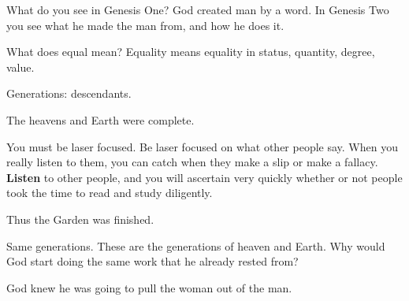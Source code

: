 \documentclass[12pt]{article}
\begin{document}
	What do you see in Genesis One? God created man by a word. 
	In Genesis Two you see what he made the man from, and how
	he does it.

	What does equal mean? Equality means equality in status, 
	quantity, degree, value.

	\begin{quote}
		\BibleGenesisFiveOne{}
	\end{quote}

	Generations: descendants.

	\begin{quote}
		\BibleGenesisTwoOne{}
	\end{quote}

	The heavens and Earth were complete.

	\begin{quote}
		\BibleGenesisOneFour{}
		\BibleGenesisOneFive{}
		\BibleGenesisOneSix{}
	\end{quote}

	You must be laser focused. Be laser focused on what other people
	say. When you really listen to them, you can catch when they make
	a slip or make a fallacy. \textbf{Listen} to other people, and you
	will ascertain very quickly whether or not people took the time
	to read and study diligently.

	\begin{quote}
		\BibleGenesisOneSeven{}
		\BibleGenesisOneEight{}
		\BibleGenesisOneNine{}
		\BibleGenesisOneTen{}
	\end{quote}

	Thus the Garden was finished.

	\begin{quote}
		\BibleGenesisTwoTwo{}
		\BibleGenesisTwoThree{}
		\BibleGenesisTwoFour{}
	\end{quote}

	Same generations. These are the generations of heaven and Earth.
	Why would God start doing the same work that he already rested
	from?

	\begin{quote}
		\BibleGenesisOneTwentySeven{}
	\end{quote}

	God knew he was going to pull the woman out of the man.

	\begin{quote}
		\BibleRevelationTwoSeven{}
	\end{quote}

	\begin{quote}
		\BibleRomansSevenTwenty{}
		\BibleRomansSevenTwentyOne{}
		\BibleRomansSevenTwentyTwo{}
		\BibleRomansSevenTwentyThree{}
		\BibleRomansSevenTwentyFour{}
	\end{quote}
\end{document}
